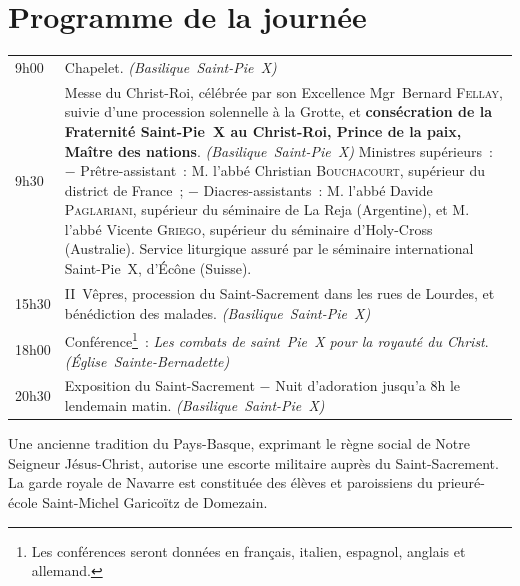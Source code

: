 \documentclass[%
a5paper%
,11pt%
,DIV=15%
,titlepage=on%
,headings=optiontoheadandtoc%
,headings=small%
,parskip=false%
,titlepage%
,openany%
]{scrbook}
\newcommand{\lieu}[1]{\hfill\linebreak[3]\hspace*{\stretch{1}}\nolinebreak\mbox{\emph{(#1)}}}
\begin{document}
\section*{Programme de la journée}

\begin{tabularx}{\textwidth-\parindent}{l!{:}X}
9h00	& Chapelet.
	  \lieu{Basilique Saint-Pie X}\\
9h30	& Messe du Christ-Roi, célébrée par son Excellence Mgr Bernard \textsc{Fellay}, suivie d'une procession solennelle à la Grotte, et \textbf{consécration de la Fraternité Saint-Pie X au Christ-Roi, Prince de la paix, Maître des nations}.
	  \lieu{Basilique Saint-Pie X}\linebreak
	  Ministres supérieurs :\linebreak
	  − Prêtre-assistant : M. l'abbé Christian \textsc{Bouchacourt}, supérieur du district de France ;\linebreak
	  − Diacres-assistants : M. l'abbé Davide \textsc{Paglariani}, supérieur du séminaire de La Reja (Argentine), et M. l'abbé Vicente \textsc{Griego}, supérieur du séminaire d'Holy-Cross (Australie).\linebreak
	  Service liturgique assuré par le séminaire international Saint-Pie X, d'Écône (Suisse).\\
15h30	& II\iemes\ Vêpres, procession du Saint-Sacrement dans les rues de Lourdes, et bénédiction des malades.
	  \lieu{Basilique Saint-Pie X}\\
18h00	& Conférence\footnote{Les conférences seront données en français, italien, espagnol, anglais et allemand.} : \emph{Les combats de saint Pie X pour la royauté du Christ}.
	  \lieu{Église Sainte-Bernadette}\\
20h30	& Exposition du Saint-Sacrement − Nuit d'adoration jusqu'a 8h le lendemain matin.
	  \lieu{Basilique Saint-Pie X}
\end{tabularx}

\vfill
{\noindent\footnotesize Une ancienne tradition du Pays-Basque, exprimant le règne social de Notre Seigneur Jésus-Christ, autorise une escorte militaire auprès du Saint-Sacrement. La garde royale de Navarre est constituée des élèves et paroissiens du prieuré-école Saint-Michel Garicoïtz de Domezain.}

\end{document}
